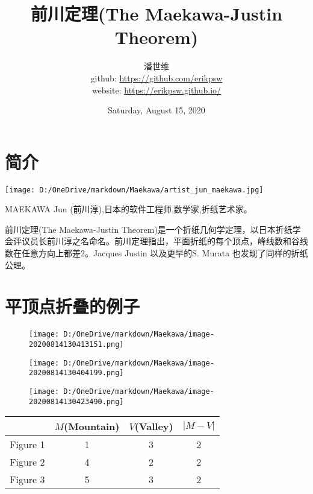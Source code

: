 \documentclass[a4paper,12pt]{article}
\begin{document}
\title {前川定理(The Maekawa-Justin Theorem)}
\author{潘世维\\github: \url{https://github.com/erikpsw}\\website: \url{https://erikpsw.github.io/}}
\date{Saturday, August 15, 2020}
\maketitle
\tableofcontents 
\section{简介} 
\begin{center}
    \texttt{[image: D:/OneDrive/markdown/Maekawa/artist\_jun\_maekawa.jpg]}
\end{center}


MAEKAWA Jun (前川淳),日本的软件工程师,数学家,折纸艺术家。\\[6pt]\par
前川定理(The Maekawa-Justin Theorem)是一个折纸几何学定理，以日本折纸学会评议员长前川淳之名命名。前川定理指出，平面折纸的每个顶点，峰线数和谷线数在任意方向上都差2。Jacques Justin 以及更早的S. Murata 也发现了同样的折纸公理。
\newpage
\section{平顶点折叠的例子}  
\begin{flushright}
\begin{figure}[h]
    \centering 
    \begin{minipage}{0.4\linewidth}
    \centering    %
    \texttt{[image: D:/OneDrive/markdown/Maekawa/image-20200814130413151.png]}	 
    \caption{}
    \end{minipage}
    \hfill
    \begin{minipage}{0.4\linewidth}
    \centering    %
    \texttt{[image: D:/OneDrive/markdown/Maekawa/image-20200814130404199.png]}
    \caption{}
    \end{minipage}
    \texttt{[image: D:/OneDrive/markdown/Maekawa/image-20200814130423490.png]}
    \caption{}
\end{figure}
\end{flushright}

\begin{table}[!htbp]
    \centering
    \begin{tabular}{|l|c|l|l|c|l|c|}
    \hline
     & \multicolumn{3}{c|}{$M$(Mountain)} & \multicolumn{2}{c|}{$V$(Valley)} & \multicolumn{1}{l|}{$|M-V|$} \\ \hline
    Figure 1 & \multicolumn{3}{c|}{1} & \multicolumn{2}{c|}{3} & {\color{red} 2} \\ \hline
    Figure 2 & \multicolumn{3}{c|}{4} & \multicolumn{2}{c|}{2} & {\color{red} 2} \\ \hline
    Figure 3 & \multicolumn{3}{c|}{5} & \multicolumn{2}{c|}{3} & {\color{red} 2} \\ \hline
    \end{tabular}
\end{table}
      
\end{document}

